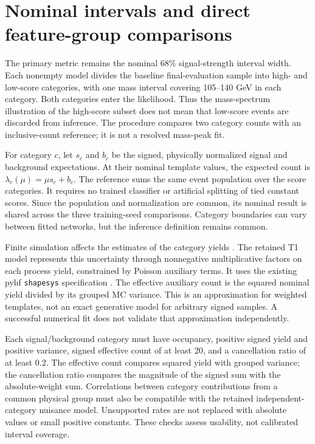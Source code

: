 \documentclass[aps,prd,reprint,superscriptaddress,nofootinbib,longbibliography,floatfix]{revtex4-2}
\begin{document}


\section{Nominal intervals and direct feature-group comparisons}

The primary metric remains the nominal 68\% signal-strength interval width. Each nonempty
model divides the baseline final-evaluation sample into high- and low-score categories, with one mass
interval covering 105--140 GeV in each category. Both categories enter the likelihood. Thus
the mass-spectrum illustration of the high-score subset does not mean that low-score events
are discarded from inference. The procedure compares two category counts with an
inclusive-count reference; it is not a resolved mass-peak fit.

For category \(c\), let \(s_c\) and \(b_c\) be the signed, physically normalized signal and
background expectations. At their nominal template values, the expected count is
\(\lambda_c(\mu)=\mu s_c+b_c\). The reference sums the same event population over the score
categories. It requires no trained classifier or artificial splitting of tied constant
scores. Since the population and normalization are common, its nominal result is shared
across the three training-seed comparisons. Category boundaries can vary between fitted
networks, but the inference definition remains common.

Finite simulation affects the estimates of the category yields \cite{BarlowBeeston1993}. The
retained T1 model represents this uncertainty through nonnegative multiplicative factors on
each process yield, constrained by Poisson auxiliary terms. It uses the existing pyhf
\nolinkurl{shapesys} specification \cite{pyhf2021}. The effective auxiliary count is the
squared nominal yield divided by its grouped MC variance. This is an approximation for
weighted templates, not an exact generative model for arbitrary signed samples. A successful
numerical fit does not validate that approximation independently.

Each signal/background category must have occupancy, positive signed yield and positive
variance, signed effective count of at least 20, and a cancellation ratio of at least 0.2.
The effective count compares squared yield with grouped variance; the cancellation ratio
compares the magnitude of the signed sum with the absolute-weight sum. Correlations between
category contributions from a common physical group must also be compatible with the
retained independent-category nuisance model. Unsupported rates are not replaced with
absolute values or small positive constants. These checks assess usability, not calibrated
interval coverage.
\end{document}
